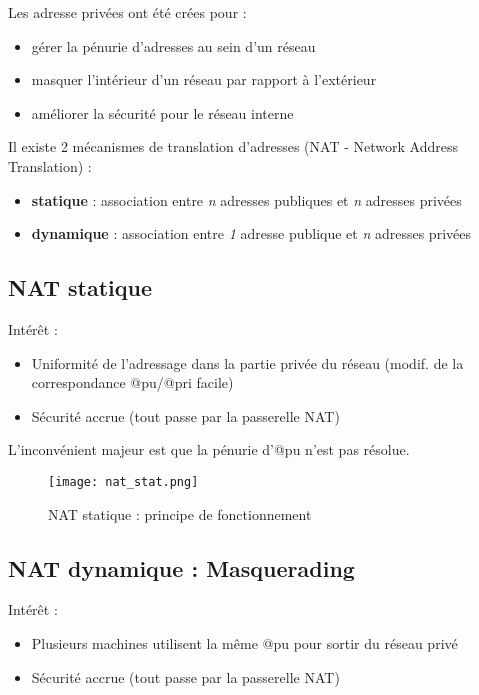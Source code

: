 \documentclass[journal, a4paper]{IEEEtran}
\begin{document}
Les adresse privées ont été crées pour :
\begin{itemize}
	\item gérer la pénurie d'adresses au sein d'un réseau
	\item masquer l'intérieur d'un réseau par rapport à l'extérieur
	\item améliorer la sécurité pour le réseau interne
\end{itemize}

Il existe 2 mécanismes de translation d'adresses (NAT - Network Address Translation) :
\begin{itemize}
	\item \textbf{statique} : association entre \textit{n} adresses publiques et \textit{n} adresses privées
	\item \textbf{dynamique} : association entre \textit{1} adresse publique et \textit{n} adresses privées
\end{itemize}

\subsection{NAT statique}

Intérêt :
\begin{itemize}
	\item Uniformité de l'adressage dans la partie privée du réseau (modif. de la correspondance @pu/@pri facile)
	\item Sécurité accrue (tout passe par la passerelle NAT)
\end{itemize}

L'inconvénient majeur est que la pénurie d'@pu n'est pas résolue.
	
\begin{figure}[!hbt]
	\begin{center}
	\texttt{[image: nat\_stat.png]}
	\caption{NAT statique : principe de fonctionnement}
	\label{fig:nat_stat}
	\end{center}
\end{figure}

\subsection{NAT dynamique : Masquerading}

Intérêt :
\begin{itemize}
	\item Plusieurs machines utilisent la même @pu pour sortir du réseau privé
	\item Sécurité accrue (tout passe par la passerelle NAT)
\end{itemize}
\end{document}
